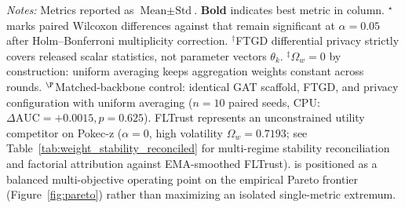 \begin{table}[!t]
{\begin{tabular}{lccccc}
\bottomrule
\end{tabular}%
}
\smallskip
\parbox{\textwidth}{\scriptsize%
\textit{Notes:} Metrics reported as $\text{Mean} \pm \text{Std}$. \textbf{Bold} indicates best metric in column. $^\star$marks paired Wilcoxon differences against \MethodName{} that remain significant at $\alpha=0.05$ after Holm--Bonferroni multiplicity correction. $^\dagger$FTGD differential privacy strictly covers released scalar statistics, not parameter vectors $\theta_k$. $^{\ddagger}\Omega_w = 0$ by construction: uniform averaging keeps aggregation weights constant across rounds. $^{\P}$Matched-backbone control: identical GAT scaffold, FTGD, and privacy configuration with uniform averaging ($n=10$ paired seeds, CPU: $\Delta\mathrm{AUC} = +0.0015, p = 0.625$). FLTrust represents an unconstrained utility competitor on Pokec-z ($\alpha=0$, high volatility $\Omega_w = 0.7193$; see Table~\ref{tab:weight_stability_reconciled} for multi-regime stability reconciliation and factorial attribution against EMA-smoothed FLTrust). \MethodName{} is positioned as a balanced multi-objective operating point on the empirical Pareto frontier (Figure~\ref{fig:pareto}) rather than maximizing an isolated single-metric extremum.}
\end{table}
